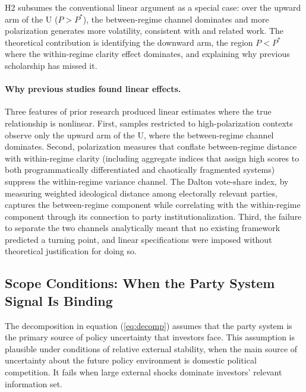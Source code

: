 \documentclass[12pt]{article}
\begin{document}
\noindent H2 subsumes the conventional linear argument as a special case:
over the upward arm of the U ($P > P^*$), the between-regime channel
dominates and more polarization generates more volatility, consistent with
\citet{Frye2002} and related work. The theoretical contribution is
identifying the downward arm, the region $P < P^*$ where the within-regime
clarity effect dominates, and explaining why previous scholarship has
missed it.

\paragraph{Why previous studies found linear effects.} Three features of
prior research produced linear estimates where the true relationship is
nonlinear. First, samples restricted to high-polarization contexts
\citep{Frye2002} observe only the upward arm of the U, where the between-regime
channel dominates. Second, polarization measures that conflate
between-regime distance with within-regime clarity (including aggregate
indices that assign high scores to both programmatically differentiated and
chaotically fragmented systems) suppress the within-regime variance
channel. The Dalton vote-share index, by measuring weighted ideological
distance among electorally relevant parties, captures the between-regime
component while correlating with the within-regime component through its
connection to party institutionalization. Third, the failure to separate
the two channels analytically meant that no existing framework predicted
a turning point, and linear specifications were imposed without theoretical
justification for doing so.

\subsection{Scope Conditions: When the Party System Signal Is Binding}

The decomposition in equation (\ref{eq:decomp}) assumes that the party system
is the primary source of policy uncertainty that investors face. This
assumption is plausible under conditions of relative external stability, when
the main source of uncertainty about the future policy environment is
domestic political competition. It fails when large external shocks dominate
investors' relevant information set.
\end{document}
